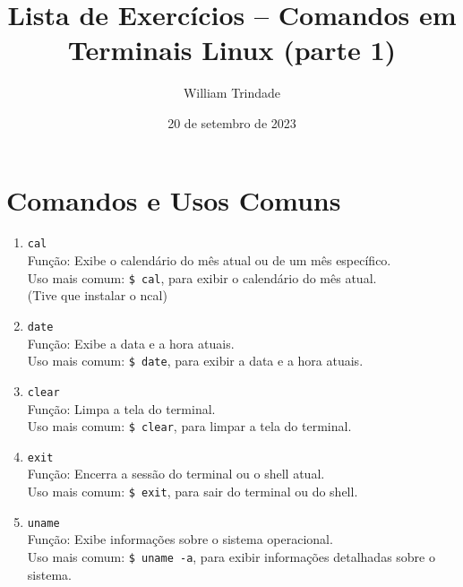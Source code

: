 \documentclass{article}
\title{Lista de Exercícios – Comandos em Terminais Linux (parte	1)}
\author{William Trindade}
\date{20 de setembro de 2023}
\begin{document}
\maketitle

\section{Comandos e Usos Comuns}

\begin{enumerate}
    \item \texttt{cal} \\
    Função: Exibe o calendário do mês atual ou de um mês específico. \\
    Uso mais comum: \texttt{\$ cal}, para exibir o calendário do mês atual.\\
    (Tive que instalar o ncal)

    \item \texttt{date} \\
    Função: Exibe a data e a hora atuais. \\
    Uso mais comum: \texttt{\$ date}, para exibir a data e a hora atuais.

    \item \texttt{clear} \\
    Função: Limpa a tela do terminal. \\
    Uso mais comum: \texttt{\$ clear}, para limpar a tela do terminal.

    \item \texttt{exit} \\
    Função: Encerra a sessão do terminal ou o shell atual. \\
    Uso mais comum: \texttt{\$ exit}, para sair do terminal ou do shell.

    \item \texttt{uname} \\
    Função: Exibe informações sobre o sistema operacional. \\
    Uso mais comum: \texttt{\$ uname -a}, para exibir informações detalhadas sobre o sistema.
\end{enumerate}
\end{document}
